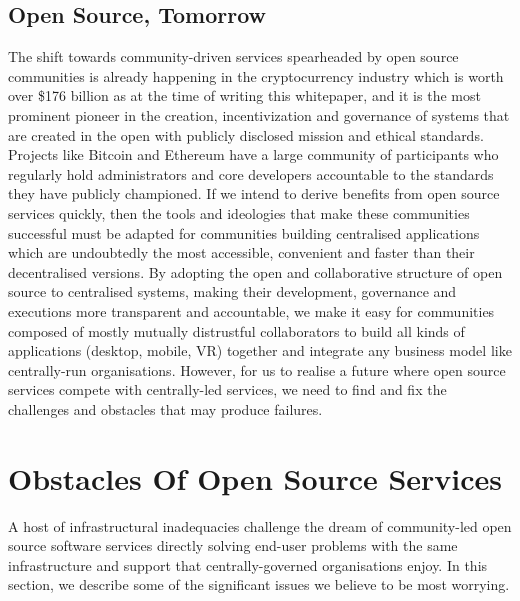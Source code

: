 \subsection{Open Source, Tomorrow}
The shift towards community-driven services spearheaded by open source communities is already happening in the cryptocurrency industry which is worth over \$176 billion as at the time of writing this whitepaper, and it is the most prominent pioneer in the creation, incentivization and governance of systems that are created in the open with publicly disclosed mission and ethical standards. Projects like Bitcoin and Ethereum have a large community of participants who regularly hold administrators and core developers accountable to the standards they have publicly championed. If we intend to derive benefits from open source services quickly, then the tools and ideologies that make these communities successful must be adapted for communities building centralised applications which are undoubtedly the most accessible, convenient and faster than their decentralised versions. By adopting the open and collaborative structure of open source to centralised systems, making their development, governance and executions more transparent and accountable, we make it easy for communities composed of mostly mutually distrustful collaborators to build all kinds of applications (desktop, mobile, VR) together and integrate any business model like centrally-run organisations. However, for us to realise a future where open source services compete with centrally-led services, we need to find and fix the challenges and obstacles that may produce failures.

\section{Obstacles Of Open Source Services}
A host of infrastructural inadequacies challenge the dream of community-led open source software services directly solving end-user problems with the same infrastructure and support that centrally-governed organisations enjoy. In this section, we describe some of the significant issues we believe to be most worrying.

